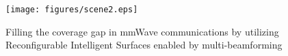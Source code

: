 

\begin{figure}
    \centering
    \texttt{[image: figures/scene2.eps]}
    \caption{Filling the coverage gap in mmWave communications by utilizing Reconfigurable Intelligent Surfaces enabled by multi-beamforming }
    \label{fig:system}
\end{figure}

